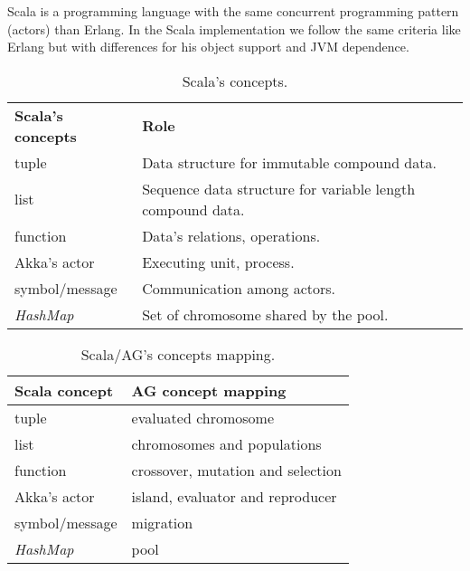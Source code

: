 
Scala is a programming language with the same concurrent programming pattern (actors) than Erlang. In the Scala implementation we follow the same criteria like Erlang but with differences for his object support and JVM dependence.


\begin{table}[h!]
  \centering
   \caption{Scala's concepts.}\label{sclConstructions}
\begin{tabular}{|>{\centering}p{3.4cm}|p{7cm}|}
  \hline
  \textbf{Scala's concepts} & \textbf{Role} \tabularnewline
  tuple & Data structure for immutable compound data. \tabularnewline
    \hline
 list & Sequence data structure for variable length compound data.
 \tabularnewline
    \hline
 function & Data's relations, operations. \tabularnewline
     \hline
    Akka's actor & Executing unit, process. \tabularnewline
     \hline
  symbol/message & Communication among actors. \tabularnewline
     \hline
  {\em HashMap} & Set of chromosome shared by the pool. \tabularnewline
     \hline
\end{tabular}

\end{table}

\begin{table}
  \centering
  \caption{Scala/AG's concepts mapping.}\label{sclAGRelation}
\begin{tabular}{|>{\centering}p{3cm}|p{6cm}|}
  \hline
  \textbf{Scala concept} & \textbf{AG concept mapping} \tabularnewline
  \hline
   tuple & evaluated chromosome \tabularnewline
    \hline
 list & chromosomes and populations \tabularnewline
    \hline
 function & crossover, mutation and selection \tabularnewline
    \hline
  Akka's actor & island, evaluator and reproducer \tabularnewline
     \hline
  symbol/message & migration \tabularnewline
     \hline
  {\em HashMap} & pool \tabularnewline
     \hline
\end{tabular}

\end{table}






